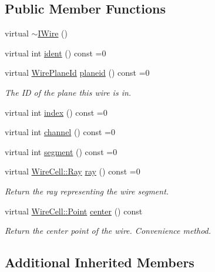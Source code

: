 \subsection*{Public Member Functions}
\begin{DoxyCompactItemize}
\item 
virtual \hyperlink{class_wire_cell_1_1_i_wire_a99180a0590802eabb706eead70d3cd65}{$\sim$\+I\+Wire} ()
\item 
virtual int \hyperlink{class_wire_cell_1_1_i_wire_a0e188a183e202dfb6dce25f6b16fc390}{ident} () const =0
\item 
virtual \hyperlink{class_wire_cell_1_1_wire_plane_id}{Wire\+Plane\+Id} \hyperlink{class_wire_cell_1_1_i_wire_ac1be702dac05d5298f7cf20a5fda910b}{planeid} () const =0
\begin{DoxyCompactList}\small\item\em The ID of the plane this wire is in. \end{DoxyCompactList}\item 
virtual int \hyperlink{class_wire_cell_1_1_i_wire_abe81fe1d38c3d0a73e812e765f2081cd}{index} () const =0
\item 
virtual int \hyperlink{class_wire_cell_1_1_i_wire_a24de34af80ad78b15137adb196ed1189}{channel} () const =0
\item 
virtual int \hyperlink{class_wire_cell_1_1_i_wire_a8628e5620e63e66790635b59ed8076ce}{segment} () const =0
\item 
virtual \hyperlink{namespace_wire_cell_a3ab20d9b438feb7eb1ffaab9ba98af0c}{Wire\+Cell\+::\+Ray} \hyperlink{class_wire_cell_1_1_i_wire_aded43e813ce82b02e7fc0316d11cfa43}{ray} () const =0
\begin{DoxyCompactList}\small\item\em Return the ray representing the wire segment. \end{DoxyCompactList}\item 
virtual \hyperlink{namespace_wire_cell_ab2b2565fa6432efbb4513c14c988cda9}{Wire\+Cell\+::\+Point} \hyperlink{class_wire_cell_1_1_i_wire_aec6abd930c2209a7bd809b30a871d1b6}{center} () const
\begin{DoxyCompactList}\small\item\em Return the center point of the wire. Convenience method. \end{DoxyCompactList}\end{DoxyCompactItemize}
\subsection*{Additional Inherited Members}


